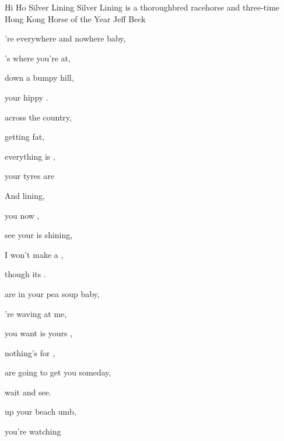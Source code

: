 \begin{SBSong}{Hi Ho Silver Lining}
  {Silver Lining is a thoroughbred racehorse and three-time Hong Kong Horse of the Year}
  {Jeff Beck}
  \begin{SBVerse}
	're everywhere and nowhere baby, 
	
	's where you're at,
	
	 down a bumpy hill,
	
	 your hippy .
	
	 across the country,
	
	 getting fat,
	
	 everything is ,
	
	 your tyres are   
  \end{SBVerse}
  \WBPageBrk
  \begin{SBChorus}
	And    lining,
	
	 you  now ,
	
	 see your  is shining,
	
	 I won't make a ,
	
	though its . 
  \end{SBChorus}
  \begin{SBVerse}
	 are in your pea soup baby,
	
	're waving at me,
	
	 you want is yours ,
	
	 nothing's for ,
	
	 are going to get you someday,
	
	 wait and see.
	
	 up your beach umb,
	
	 you're watching 
  \end{SBVerse}
\end{SBSong}
